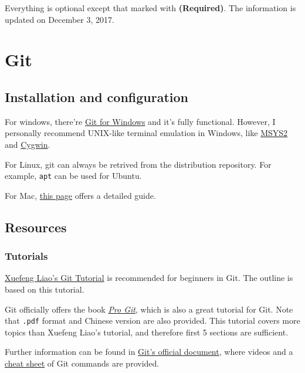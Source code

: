 \documentclass[english]{pkupaper}
\title{\titlemark}
\author{pppppass}
\date{\today}
\begin{document}
	\maketitle

Everything is optional except that marked with \textbf{(Required)}. The information is updated on December 3, 2017.

\section{Git}

\subsection{Installation and configuration}

For windows, there're \href{https://git-for-windows.github.io/}{Git for Windows} and it's fully functional. However, I personally recommend UNIX-like terminal emulation in Windows, like \href{http://www.msys2.org/}{MSYS2} and \href{https://www.cygwin.com/}{Cygwin}.

For Linux, git can always be retrived from the distribution repository. For example, \verb"apt" can be used for Ubuntu.

For Mac, \href{https://git-scm.com/book/en/v2/Getting-Started-Installing-Git}{this page} offers a detailed guide.

\subsection{Resources}

\subsubsection{Tutorials}

\href{https://www.liaoxuefeng.com/wiki/0013739516305929606dd18361248578c67b8067c8c017b000/}{Xuefeng Liao's Git Tutorial} is recommended for beginners in Git. The outline is based on this tutorial.

Git officially offers the book \href{https://git-scm.com/book/en/v2}{\emph{Pro Git}}, which is also a great tutorial for Git. Note that \verb".pdf" format and Chinese version are also provided. This tutorial covers more topics than Xuefeng Liao's tutorial, and therefore first 5 sections are sufficient.

Further information can be found in \href{https://git-scm.com/doc}{Git's official document}, where videos and a \href{https://services.github.com/on-demand/downloads/github-git-cheat-sheet.pdf}{cheat sheet} of Git commands are provided.
\end{document}
